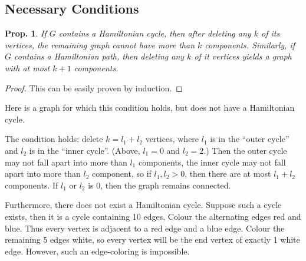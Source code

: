 \documentclass[12pt, a4paper]{book}
\newtheorem{proposition}[theorem]{Prop.}
\theoremstyle{nonumberplain}
\newtheorem{proof}{Proof}
\begin{document}
\subsection{Necessary Conditions}
\begin{proposition}
    If $G$ contains a Hamiltonian cycle, then after deleting any $k$ of its vertices, the remaining graph cannot have more than $k$ components.
    Similarly, if $G$ contains a Hamiltonian path, then deleting any $k$ of it vertices yields a graph with at most $k+1$ components.
\end{proposition}
\begin{proof}
    This can be easily proven by induction.
\end{proof}
Here is a graph for which this condition holds, but does not have a Hamiltonian cycle.
\begin{center}
\end{center}
The condition holds: delete $k=l_1+l_2$ vertices, where $l_1$ is in the ``outer cycle'' and $l_2$ is in the ``inner cycle''.
(Above, $l_1=0$ and $l_2=2$.)
Then the outer cycle may not fall apart into more than $l_1$ components, the inner cycle may not fall apart into more than $l_2$ component, so if $l_1,l_2>0$, then there are at most $l_1+l_2$ components.
If $l_1$ or $l_2$ is $0$, then the graph remains connected.

Furthermore, there does not exist a Hamiltonian cycle.
Suppose such a cycle exists, then it is a cycle containing 10 edges.
Colour the alternating edges red and blue.
Thus every vertex is adjacent to a red edge and a blue edge.
Colour the remaining 5 edges white, so every vertex will be the end vertex of exactly 1 white edge.
However, such an edge-coloring is impossible.
\end{document}
